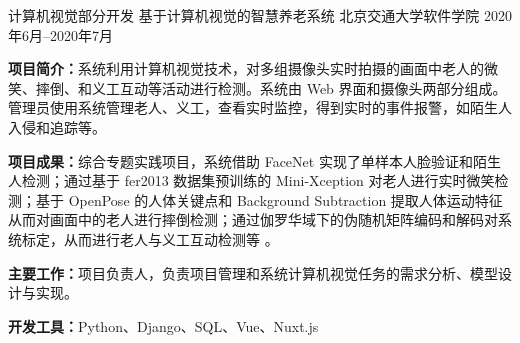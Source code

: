 \begin{cventries}
	\cventry
	{计算机视觉部分开发} %
	{基于计算机视觉的智慧养老系统 \href{https://tang5618.com/wordpress/?p=1053}{{\color{awesome}\faChain}}} %
	{北京交通大学软件学院} %
	{2020年6月--2020年7月} %
	{
		\begin{cvitems} %
			\item {\textbf{项目简介：}系统利用计算机视觉技术，对多组摄像头实时拍摄的画面中老人的微笑、摔倒、和义工互动等活动进行检测。系统由 Web 界面和摄像头两部分组成。管理员使用系统管理老人、义工，查看实时监控，得到实时的事件报警，如陌生人入侵和追踪等。}
			\item {\textbf{项目成果：}综合专题实践项目，系统借助 FaceNet 实现了单样本人脸验证和陌生人检测；通过基于 fer2013 数据集预训练的 Mini-Xception 对老人进行实时微笑检测；基于 OpenPose 的人体关键点和 Background Subtraction 提取人体运动特征从而对画面中的老人进行摔倒检测；通过伽罗华域下的伪随机矩阵编码和解码对系统标定，从而进行老人与义工互动检测等 \href{https://github.com/Tang1705/CVofSSE}{{\color{awesome}\faGithub}}。}
			\item {\textbf{主要工作：}项目负责人，负责项目管理和系统计算机视觉任务的需求分析、模型设计与实现。}
			\item {\textbf{开发工具：}Python、Django、SQL、Vue、Nuxt.js}
		\end{cvitems}
	}
\end{cventries}
